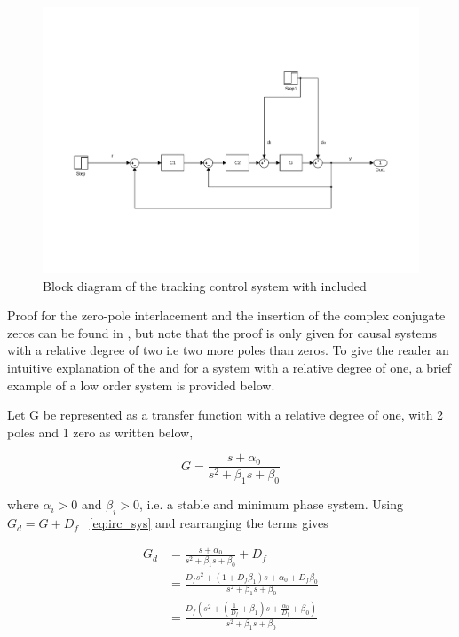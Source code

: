 \begin{figure}[h]
  \centering %
  \includegraphics[width=1\textwidth, trim=4cm 5cm 3.6cm 9.5cm, clip=true]{fig/matlab/irc_int}
  \caption{\label{fig:irc_int}Block diagram of the tracking control system with \abbrIRC included}
\end{figure}

Proof for the zero-pole interlacement and the insertion of the complex conjugate zeros can be found in \citep{Aphale:2007}, but note that the proof is only given for causal systems with a relative degree of two i.e two more poles than zeros. To give the reader an intuitive explanation of the \abbrIRC and for a system with a relative degree of one, a brief example of a low order system is provided below.

Let G be represented as a transfer function with a relative degree of one, with 2 poles and 1 zero as written below,

\begin{equation}
  \label{eq:irc_sys}
  G = \frac{s + \alpha_0}{s^2 + \beta_1s + \beta_0}
\end{equation}

where  $\alpha_i > 0$ and  $\beta_i > 0$, i.e. a stable and minimum phase system.  Using $G_d = G + D_f$  ~\eqref{eq:irc_sys} and rearranging the terms gives

\begin{equation}
  \label{eq:irc_sys_d}
  \begin{split}
  G_d & = \frac{s + \alpha_0}{s^2 + \beta_1s + \beta_0} + D_f \\
      & = \frac{D_fs^2 + (1 + D_f\beta_1)s + \alpha_0 + D_f\beta_0}{s^2 + \beta_1s + \beta_0} \\
      & = \frac{D_f(s^2 + (\frac{1}{D_f} + \beta_1)s + \frac{\alpha_0}{D_f} + \beta_0)}{s^2 + \beta_1s + \beta_0}
  \end{split}
\end{equation}

